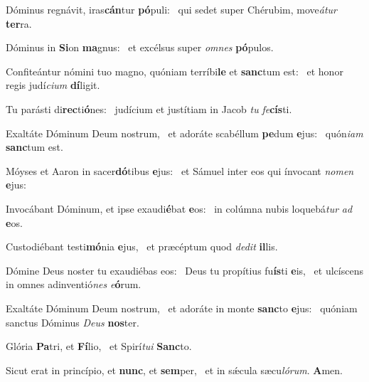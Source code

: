 \item Dóminus regnávit, iras\textbf{cán}tur \textbf{pó}puli:~\psstar{} qui sedet super Chérubim, move\textit{átur} \textbf{ter}ra.
\item Dóminus in \textbf{Si}on \textbf{ma}gnus:~\psstar{} et excélsus super \textit{omnes} \textbf{pó}pulos.
\item Confiteántur nómini tuo magno, quóniam terríbi\textbf{le} et \textbf{sanc}tum est:~\psstar{} et honor regis judí\textit{cium} \textbf{dí}ligit.
\item Tu parásti di\textbf{rec}ti\textbf{ó}nes:~\psstar{} judícium et justítiam in Jacob \textit{tu} \textit{fe}\textbf{cís}ti.
\item Exaltáte Dóminum Deum nostrum,~\pscross{} et adoráte scabéllum \textbf{pe}dum \textbf{e}jus:~\psstar{} quón\textit{iam} \textbf{sanc}tum est.
\item Móyses et Aaron in sacer\textbf{dó}tibus \textbf{e}jus:~\psstar{} et Sámuel inter eos qui ínvocant \textit{nomen} \textbf{e}jus:
\item Invocábant Dóminum, et ipse exaudi\textbf{é}bat \textbf{e}os:~\psstar{} in colúmna nubis loquebá\textit{tur} \textit{ad} \textbf{e}os.
\item Custodiébant testi\textbf{mó}nia \textbf{e}jus,~\psstar{} et præcéptum quod \textit{dedit} \textbf{il}lis.
\item Dómine Deus noster tu exaudiébas eos:~\pscross{} Deus tu propítius fu\textbf{ís}ti \textbf{e}is,~\psstar{} et ulcíscens in omnes adinventió\textit{nes} \textit{e}\textbf{ó}rum.
\item Exaltáte Dóminum Deum nostrum,~\pscross{} et adoráte in monte \textbf{sanc}to \textbf{e}jus:~\psstar{} quóniam sanctus Dóminus \textit{Deus} \textbf{nos}ter.
\item Glória \textbf{Pa}tri, et \textbf{Fí}lio,~\psstar{} et Spirí\textit{tui} \textbf{Sanc}to.
\item Sicut erat in princípio, et \textbf{nunc}, et \textbf{sem}per,~\psstar{} et in sǽcula sæcu\textit{lórum}. \textbf{A}men.
